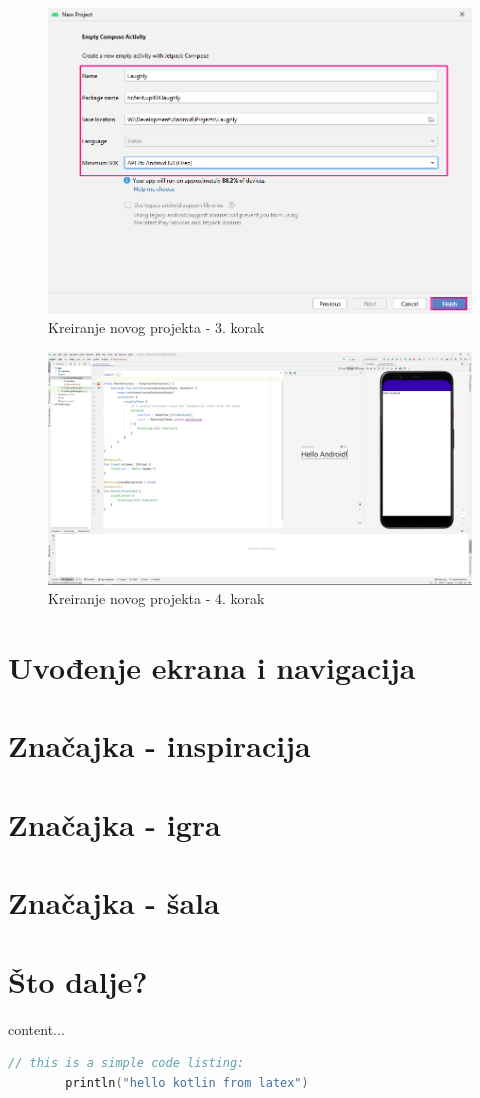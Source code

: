 \documentclass[11pt,a4paper,twoside]{article}
\begin{document}
\begin{figure}[!h]
	\centering
	\includegraphics[width=\textwidth]{new_project_03.png}
	\caption{Kreiranje novog projekta - 3. korak}
	\label{fig:new_project_03}	
\end{figure}

\begin{figure}[!h]
	\centering
	\includegraphics[width=\textwidth]{new_project_04.png}
	\caption{Kreiranje novog projekta - 4. korak}
	\label{fig:new_project_04}	
\end{figure}

\section{Uvođenje ekrana i navigacija}
\section{Značajka - inspiracija}
\section{Značajka - igra}
\section{Značajka - šala}
\section{Što dalje?}

	
	
	content...
	\begin{lstlisting}[caption={Simple code listing.}, label={lst:example1}, language=Kotlin]
		// this is a simple code listing:
		println("hello kotlin from latex")
	\end{lstlisting}
\end{document}
